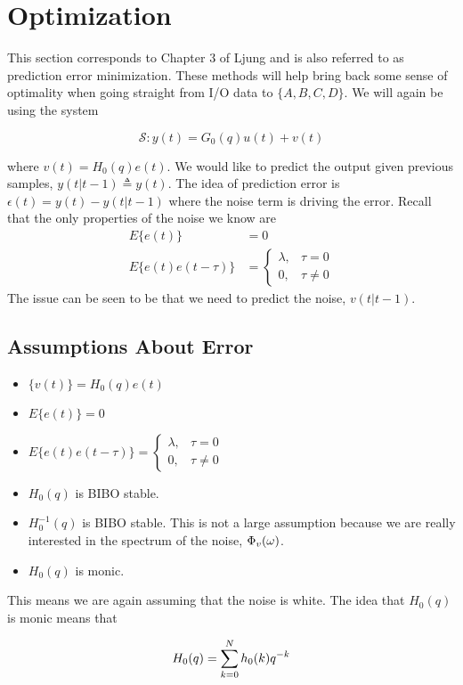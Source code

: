 \section{Optimization}
This section corresponds to Chapter 3 of Ljung and is also referred to as prediction error minimization.
These methods will help bring back some sense of optimality when going straight from I/O data to $\{A,B,C,D\}$.
We will again be using the system

\begin{equation*}
\mathcal{S}: y(t) = G_0(q)u(t)+v(t)
\end{equation*}

where $v(t) = H_0(q)e(t)$.
We would like to predict the output given previous samples, $y(t|t-1)\triangleq y(t)$.
The idea of prediction error is $\epsilon(t)=y(t)-y(t|t-1)$ where the noise term is driving the error.
Recall that the only properties of the noise we know are
\begin{align*}
E\{e(t)\} &= 0 \\
E\{e(t)e(t-\tau)\} &= \begin{cases} \lambda, & \tau=0 \\ 0, & \tau\neq0 \end{cases}
\end{align*}
The issue can be seen to be that we need to predict the noise, $v(t|t-1)$.

\subsection{Assumptions About Error}
\begin{itemize}
\item $\{v(t)\} = H_0(q)e(t)$
\item $E\{e(t)\} = 0$
\item $E\{e(t)e(t-\tau)\} = \begin{cases} \lambda, & \tau=0 \\ 0, & \tau\neq0 \end{cases}$
\item $H_0(q)$ is BIBO stable.
\item $H_0^{-1}(q)$ is BIBO stable. This is not a large assumption because we are really interested in the spectrum of the noise, $\Phi_v(\omega)$.
\item $H_0(q)$ is monic.
\end{itemize}
This means we are again assuming that the noise is white.
The idea that $H_0(q)$ is monic means that

\begin{equation*}
H_0(q)=\sum_{k=0}^N h_0(k)q^{-k}
\end{equation*}

